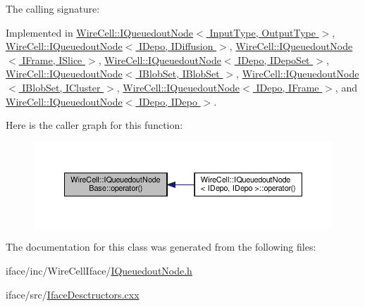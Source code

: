 The calling signature\+: 



Implemented in \hyperlink{class_wire_cell_1_1_i_queuedout_node_a38fcceec4026ddc65245206b24e62265}{Wire\+Cell\+::\+I\+Queuedout\+Node$<$ Input\+Type, Output\+Type $>$}, \hyperlink{class_wire_cell_1_1_i_queuedout_node_a38fcceec4026ddc65245206b24e62265}{Wire\+Cell\+::\+I\+Queuedout\+Node$<$ I\+Depo, I\+Diffusion $>$}, \hyperlink{class_wire_cell_1_1_i_queuedout_node_a38fcceec4026ddc65245206b24e62265}{Wire\+Cell\+::\+I\+Queuedout\+Node$<$ I\+Frame, I\+Slice $>$}, \hyperlink{class_wire_cell_1_1_i_queuedout_node_a38fcceec4026ddc65245206b24e62265}{Wire\+Cell\+::\+I\+Queuedout\+Node$<$ I\+Depo, I\+Depo\+Set $>$}, \hyperlink{class_wire_cell_1_1_i_queuedout_node_a38fcceec4026ddc65245206b24e62265}{Wire\+Cell\+::\+I\+Queuedout\+Node$<$ I\+Blob\+Set, I\+Blob\+Set $>$}, \hyperlink{class_wire_cell_1_1_i_queuedout_node_a38fcceec4026ddc65245206b24e62265}{Wire\+Cell\+::\+I\+Queuedout\+Node$<$ I\+Blob\+Set, I\+Cluster $>$}, \hyperlink{class_wire_cell_1_1_i_queuedout_node_a38fcceec4026ddc65245206b24e62265}{Wire\+Cell\+::\+I\+Queuedout\+Node$<$ I\+Depo, I\+Frame $>$}, and \hyperlink{class_wire_cell_1_1_i_queuedout_node_a38fcceec4026ddc65245206b24e62265}{Wire\+Cell\+::\+I\+Queuedout\+Node$<$ I\+Depo, I\+Depo $>$}.

Here is the caller graph for this function\+:
\nopagebreak
\begin{figure}[H]
\begin{center}
\leavevmode
\includegraphics[width=350pt]{class_wire_cell_1_1_i_queuedout_node_base_ad3723d92a4594fc9e3d6718fc0de9b1c_icgraph}
\end{center}
\end{figure}


The documentation for this class was generated from the following files\+:\begin{DoxyCompactItemize}
\item 
iface/inc/\+Wire\+Cell\+Iface/\hyperlink{_i_queuedout_node_8h}{I\+Queuedout\+Node.\+h}\item 
iface/src/\hyperlink{_iface_desctructors_8cxx}{Iface\+Desctructors.\+cxx}\end{DoxyCompactItemize}

